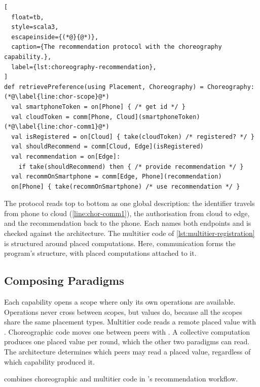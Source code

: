 \begin{lstlisting}[
  float=tb,
  style=scala3,
  escapeinside={(*@}{@*)},
  caption={The recommendation protocol with the choreography capability.},
  label={lst:choreography-recommendation},
]
def retrievePreference(using Placement, Choreography) = Choreography:(*@\label{line:chor-scope}@*)
  val smartphoneToken = on[Phone] { /* get id */ }
  val cloudToken = comm[Phone, Cloud](smartphoneToken)(*@\label{line:chor-comm1}@*)
  val isRegistered = on[Cloud] { take(cloudToken) /* registered? */ }
  val shouldRecommend = comm[Cloud, Edge](isRegistered)
  val recommendation = on[Edge]:
    if take(shouldRecommend) then { /* provide recommendation */ }
  val recommOnSmartphone = comm[Edge, Phone](recommendation)
  on[Phone] { take(recommOnSmartphone) /* use recommendation */ }
\end{lstlisting}

The protocol reads top to bottom as one global description:
the identifier travels from phone to cloud (\cref{line:chor-comm1}),
the authorisation from cloud to edge,
and the recommendation back to the phone.
%
Each  names both endpoints and is checked against the architecture.
%
The multitier code of \cref{lst:multitier-registration} is structured around placed computations.
Here, communication forms the program's structure, with placed computations attached to it.

\subsection{Composing Paradigms}
\label{subsec:paradigm-composition}

Each capability opens a scope where only its own operations are available.
%
Operations never cross between scopes, but values do, because all the scopes share the same placement types.
%
Multitier code reads a remote placed value with .
Choreographic code moves one between peers with .
A collective computation produces one placed value per round, which the other two paradigms can read.
%
The architecture determines which peers may read a placed value, regardless of which capability produced it.

 combines choreographic and multitier code in \cityevt's recommendation workflow.

